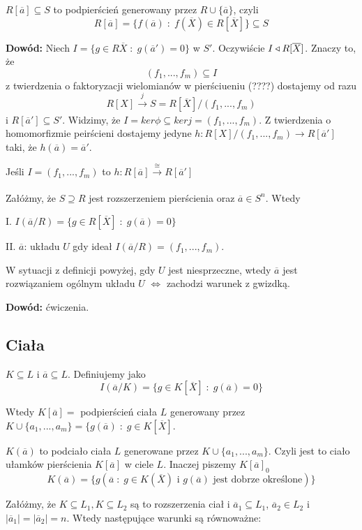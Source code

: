 $R[\overline a]\subseteq S$ to podpierścień generowany przez $R\cup\{\overline a\}$, czyli
$$R[\overline a]=\{f(\overline a)\;:\;f(\overline X)\in R[\overline X]\}\subseteq S$$

\textbf{Dowód:} Niech $I=\{g\in R{\overline X}\;:\;g(\overline a')=0\}$ w $S'$. Oczywiście $I\triangleleft R[\overline X]$. Znaczy to, że 
$$(f_1,...,f_m)\subseteq I$$
z twierdzenia o faktoryzacji wielomianów w pierściueniu (????) dostajemy od razu
$$R[X]\xrightarrow[]{j} S=R[\overline X]/(f_1,...,f_m)$$
i $R[\overline a']\subseteq S'$. Widzimy, że $I=ker\phi\subseteq ker j=(f_1,...,f_m)$. Z twierdzenia o homomorfizmie peirścieni dostajemy jedyne $h:R[X]/(f_1,...,f_m)\to R[\overline a']$ taki, że $h(\overline a)=\overline a'$.

 Jeśli $I=(f_1,...,f_m)$ to $h:R[\overline a]\xrightarrow[]{\cong}R[\overline a']$

 Załóżmy, że $S\supseteq R$ jest rozszerzeniem pierścienia oraz $\overline a\in S^n$. Wtedy

\indent I. $I(\overline a/R)=\{g\in R[\overline X]\;:\;g(\overline a)=0\}$

\indent II. $\overline a$:  układu $U$ gdy ideał $I(\overline a/R)=(f_1,...,f_m)$.

 W sytuacji z definicji powyżej, gdy $U$ jest niesprzeczne, wtedy $\overline a$ jest rozwiązaniem ogólnym układu $U$ $\iff$ zachodzi warunek z gwizdką.

\textbf{Dowód:} ćwiczenia.

\subsection{Ciała}

$K\subseteq L$ i $\overline a\subseteq L$. Definiujemy  jako
$$I(\overline a/K)=\{g\in K[\overline X]\;:\;g(\overline a)=0\}$$

Wtedy $K[\overline a]=$ podpierścień ciała $L$ generowany przez $K\cup\{a_1,...,a_m\}=\{g(\overline a)\;:\;g\in K[\overline X]$.

$K(\overline a)$ to podciało ciała $L$ generowane przez $K\cup\{a_1,...,a_m\}$. Czyli jest to ciało ułamków pierścienia $K[\overline a]$ w ciele $L$. Inaczej piszemy $K[\overline a]_0$ 
$$K(\overline a)=\{g(\overline a\;:\;g\in K(\overline X)\text{ i } g(\overline a)\text{ jest dobrze określone})\}$$

 Załóżmy, że $K\subseteq L_1,K\subseteq L_2$ są to rozszerzenia ciał i $\overline a_1\subseteq L_1$, $\overline a_2\in L_2$ i $|\overline a_1|=|\overline a_2|=n$. Wtedy następujące warunki są równoważne:

